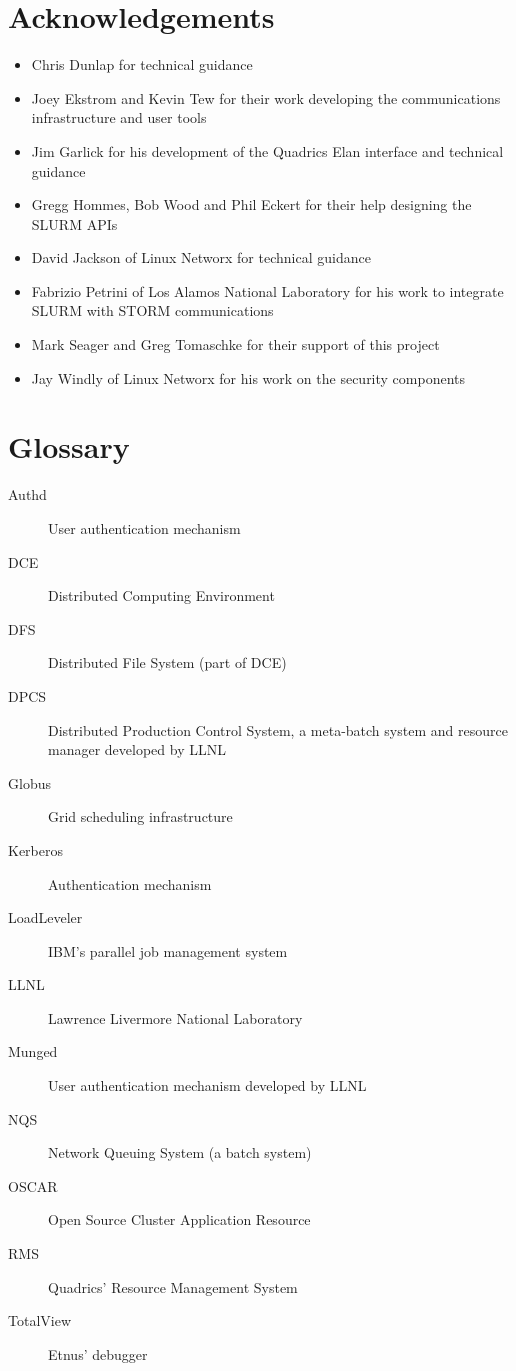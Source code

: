 \section{Acknowledgements}

\begin{itemize}
\item Chris Dunlap for technical guidance
\item Joey Ekstrom and Kevin Tew for their work developing the communications
infrastructure and user tools
\item Jim Garlick for his development of the Quadrics Elan interface and 
technical guidance
\item Gregg Hommes, Bob Wood and Phil Eckert for their help designing the 
SLURM APIs
\item David Jackson of Linux Networx for technical guidance
\item Fabrizio Petrini of Los Alamos National Laboratory for his work to 
integrate SLURM with STORM communications 
\item Mark Seager and Greg Tomaschke for their support of this project
\item Jay Windly of Linux Networx for his work on the security components
\end{itemize}

\appendix
\newpage

\section{Glossary}

\begin{description}
\item[Authd]    User authentication mechanism
\item[DCE]	Distributed Computing Environment
\item[DFS]	Distributed File System (part of DCE)
\item[DPCS]	Distributed Production Control System, a meta-batch system 
		and resource manager developed by LLNL
\item[Globus]	Grid scheduling infrastructure
\item[Kerberos]	Authentication mechanism
\item[LoadLeveler] IBM's parallel job management system
\item[LLNL]	Lawrence Livermore National Laboratory
\item[Munged]   User authentication mechanism developed by LLNL
\item[NQS]	Network Queuing System (a batch system)
\item[OSCAR]	Open Source Cluster Application Resource
\item[RMS]	Quadrics' Resource Management System
\item[TotalView] Etnus' debugger
\end{description}

\newpage


